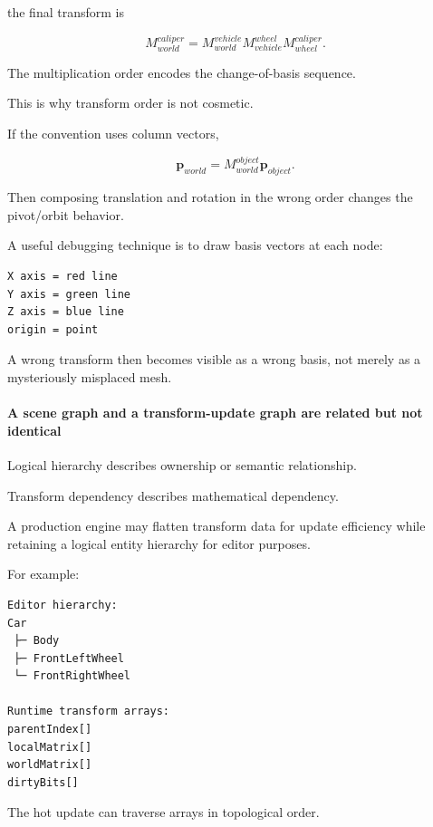 the final transform is

\[
M_{world}^{caliper}
=
M_{world}^{vehicle}
M_{vehicle}^{wheel}
M_{wheel}^{caliper}.
\]

The multiplication order encodes the change-of-basis sequence.

This is why transform order is not cosmetic.

If the convention uses column vectors,

\[
\mathbf p_{world}
=
M_{world}^{object}
\mathbf p_{object}.
\]

Then composing translation and rotation in the wrong order changes the pivot/orbit behavior.

A useful debugging technique is to draw basis vectors at each node:

\begin{verbatim}
X axis = red line
Y axis = green line
Z axis = blue line
origin = point
\end{verbatim}

A wrong transform then becomes visible as a wrong basis, not merely as a mysteriously misplaced mesh.

\paragraph{A scene graph and a transform-update graph are related but not identical}\label{03-visual-computing-i-ch001-a-scene-graph-and-a-transform-update-graph-are-related-but-not-identical}

\hypertarget{03-visual-computing-i-ch001-a-scene-graph-and-a-transform-update-graph-are-related-but-not-identical}{}

Logical hierarchy describes ownership or semantic relationship.

Transform dependency describes mathematical dependency.

A production engine may flatten transform data for update efficiency while retaining a logical entity hierarchy for editor purposes.

For example:

\begin{verbatim}
Editor hierarchy:
Car
 ├─ Body
 ├─ FrontLeftWheel
 └─ FrontRightWheel

Runtime transform arrays:
parentIndex[]
localMatrix[]
worldMatrix[]
dirtyBits[]
\end{verbatim}

The hot update can traverse arrays in topological order.

